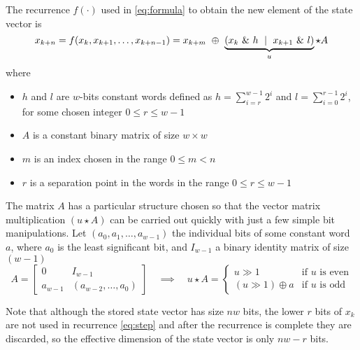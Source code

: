 \documentclass[preprint,1p,times]{elsarticle}
\begin{document}
	The recurrence $f(\cdot)$ used in \eqref{eq:formula} to obtain the new element of the state vector is
	\begin{equation}
		\label{eq:step}
		x_{k+n} = f(x_{k},x_{k+1}, \dots, x_{k+n-1}) = x_{k+m} ~\mathbin{\oplus} ~\underbrace{\left({x_k}~\&~h ~\mid~ x_{k+1}~\&~l\right) }_u \star A 
	\end{equation}
	where
	\begin{itemize}
		\item $h$ and $l$ are $w$-bits constant words defined as $h=\sum_{i=r}^{w-1}2^i$ and $l=\sum_{i=0}^{r-1}2^i$, for some chosen integer $0 \le r \le w-1$ 
		\item $A$ is a constant binary matrix of size $w \times w$
		\item $m$ is an index chosen in the range $0 \le m < n$
		\item $r$ is a separation point in the words in the range $0 \le r \le w-1$
	\end{itemize}
	
	The matrix $A$ has a particular structure chosen so that the vector matrix multiplication $(u\star A)$ can be carried out quickly with just a few simple bit manipulations. Let $(a_0, a_1, \dots, a_{w-1})$ the individual bits of some constant word $a$, where $a_0$ is the least significant bit, and $I_{w-1}$ a binary identity matrix of size $(w-1)$
	\begin{equation}
		\label{eq:matmult}
		A = \left[ \begin{matrix} 0 & I_{w - 1} \\ a_{w-1} & (a_{w - 2}, \ldots , a_0) \end{matrix} \right] \quad \implies \quad u\star A = \begin{cases}u \gg 1 & \text{if $u$ is even}\\(u \gg 1) \oplus a & \text{if $u$ is odd}\end{cases}
	\end{equation}
	
	Note that although the stored state vector has size $nw$ bits, the lower $r$ bits of $x_k$ are not used in recurrence \eqref{eq:step} and after the recurrence is complete they are discarded, so the effective dimension of the state vector is only $nw-r$ bits. \\ %
	
\end{document}

